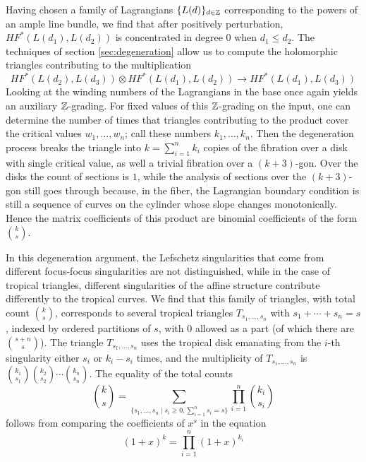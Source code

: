 \documentclass[12pt]{amsart}
\begin{document}
Having chosen a family of Lagrangians $\{L(d)\}_{d\in\mathbb{Z}}$
corresponding to the powers of an ample line bundle, we find that
after positively perturbation, $HF^*(L(d_1),L(d_2))$ is concentrated
in degree $0$ when $d_1 \leq d_2$. The techniques of section
\ref{sec:degeneration} allow us to compute the holomorphic triangles
contributing to the multiplication
\begin{equation}
  HF^*(L(d_2),L(d_3))\otimes HF^*(L(d_1),L(d_2))\to HF^*(L(d_1),L(d_3))
\end{equation}
Looking at the winding numbers of the Lagrangians in the base once
again yields an auxiliary $\mathbb{Z}$-grading. For fixed values of this
$\mathbb{Z}$-grading on the input, one can determine the number of times that
triangles contributing to the product cover the critical values $w_1,
\dots, w_n$; call these numbers $k_1,\dots,k_n$. Then the degeneration
process breaks the triangle into $k = \sum_{i=1}^n k_i$ copies of the
fibration over a disk with single critical value, as well a trivial
fibration over a $(k+3)$-gon. Over the disks the count of sections is
$1$, while the analysis of sections over the $(k+3)$-gon still goes
through because, in the fiber, the Lagrangian boundary condition is
still a sequence of curves on the cylinder whose slope changes
monotonically. Hence the matrix coefficients of this product are
binomial coefficients of the form $\binom{k}{s}$. 

In this degeneration argument, the Lefschetz singularities that come
from different focus-focus singularities are not distinguished, while
in the case of tropical triangles, different singularities of the
affine structure contribute differently to the tropical curves. We
find that this family of triangles, with total count $\binom{k}{s}$,
corresponds to several tropical triangles $T_{s_1,\dots,s_n}$ with
$s_1+\cdots+s_n = s$, indexed by ordered partitions of $s$, with $0$
allowed as a part (of which there are $\binom{s+n}{s}$). The triangle
$T_{s_1,\dots,s_n}$ uses the tropical disk emanating from the $i$-th
singularity either $s_i$ or $k_i-s_i$ times, and the multiplicity of
$T_{s_1,\dots,s_n}$ is
$\binom{k_1}{s_1}\binom{k_2}{s_2}\cdots\binom{k_n}{s_n}$. The equality
of the total counts
\begin{equation}
  \binom{k}{s} = \sum_{\{s_1,\dots,s_n \mid s_i \geq 0,
    \sum_{i=1}^n s_i = s\}} \prod_{i=1}^n \binom{k_i}{s_i}
\end{equation}
follows from comparing the coefficients of $x^s$ in the equation
\begin{equation}
  (1+x)^k = \prod_{i=1}^n (1+x)^{k_i}
\end{equation}
\end{document}
